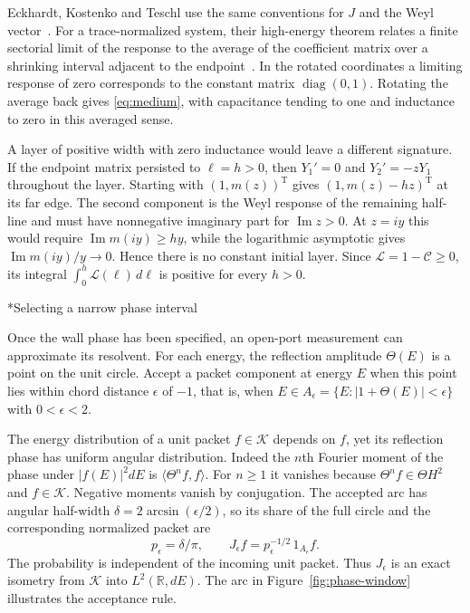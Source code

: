 \documentclass[11pt,letterpaper]{article}
\makeatletter
\renewcommand\subsection{\@startsection{subsection}{2}{\z@}{-2.0ex plus -.3ex}{.75ex}{\normalfont\normalsize\itshape}}
\newcommand{\K}{\mathcal K}
\numberwithin{equation}{section}
\makeatother
\begin{document}
Eckhardt, Kostenko and Teschl use the same conventions for $J$ and the Weyl vector~\cite[Eqs.~(2.2), (2.6)]{canonicalphysics}. For a trace-normalized system, their high-energy theorem relates a finite sectorial limit of the response to the average of the coefficient matrix over a shrinking interval adjacent to the endpoint~\cite[Theorem~3.1 and Eq.~(2.23)]{canonicalphysics}. In the rotated coordinates a limiting response of zero corresponds to the constant matrix $\operatorname{diag}(0,1)$. Rotating the average back gives \eqref{eq:medium}, with capacitance tending to one and inductance to zero in this averaged sense.

A layer of positive width with zero inductance would leave a different signature. If the endpoint matrix persisted to $\ell=h>0$, then $Y_1'=0$ and $Y_2'=-zY_1$ throughout the layer. Starting with $(1,m(z))^{\mathrm T}$ gives $(1,m(z)-hz)^{\mathrm T}$ at its far edge. The second component is the Weyl response of the remaining half-line and must have nonnegative imaginary part for $\operatorname{Im}z>0$. At $z=iy$ this would require $\operatorname{Im}m(iy)\ge hy$, while the logarithmic asymptotic gives $\operatorname{Im}m(iy)/y\to0$. Hence there is no constant initial layer. Since $\mathcal L=1-\mathcal C\ge0$, its integral $\int_0^h\mathcal L(\ell)\,d\ell$ is positive for every $h>0$.

\subsection*{Selecting a narrow phase interval}

Once the wall phase has been specified, an open-port measurement can approximate its resolvent. For each energy, the reflection amplitude $\Theta(E)$ is a point on the unit circle. Accept a packet component at energy $E$ when this point lies within chord distance $\epsilon$ of $-1$, that is, when $E\in A_\epsilon=\{E:|1+\Theta(E)|<\epsilon\}$ with $0<\epsilon<2$.

The energy distribution of a unit packet $f\in\K$ depends on $f$, yet its reflection phase has uniform angular distribution. Indeed the $n$th Fourier moment of the phase under $|f(E)|^2dE$ is $\langle\Theta^n f,f\rangle$. For $n\ge1$ it vanishes because $\Theta^n f\in\Theta H^2$ and $f\in\K$. Negative moments vanish by conjugation. The accepted arc has angular half-width $\delta=2\arcsin(\epsilon/2)$, so its share of the full circle and the corresponding normalized packet are
\[
 p_\epsilon=\delta/\pi,\qquad
 J_\epsilon f=p_\epsilon^{-1/2}\,1_{A_\epsilon}f .
\]
The probability is independent of the incoming unit packet. Thus $J_\epsilon$ is an exact isometry from $\K$ into $L^2(\mathbb R,dE)$. The arc in Figure~\ref{fig:phase-window} illustrates the acceptance rule.
\end{document}
